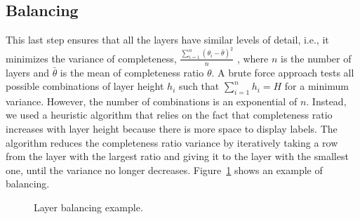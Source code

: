 \subsection{Balancing}
This last step ensures that all the layers have similar levels of detail, i.e., it minimizes the variance of completeness,
$\frac{\sum\limits_{i=1}^{n}(\theta_i - \bar{\theta})^2} {n}$
, where $n$ is the number of layers and $\bar{\theta}$ is the mean of completeness ratio $\theta$. A brute force approach tests all possible combinations of layer height $h_i$ such that $\sum_{i=1}^{n}h_i=H$ for a minimum variance. However, the number of combinations is an exponential of $n$. Instead, we used a heuristic algorithm that relies on the fact that completeness ratio increases with layer height because there is more space to display labels. The algorithm reduces the completeness ratio variance by iteratively taking a row from the layer with the largest ratio and giving it to the layer with the smallest one, until the variance no longer decreases. Figure~\ref{fig:balancing} shows an example of balancing.

\begin{figure}[ht]
	\centering
	\hfill
	\caption{Layer balancing example.}
	\label{fig:balancing}
\end{figure}

